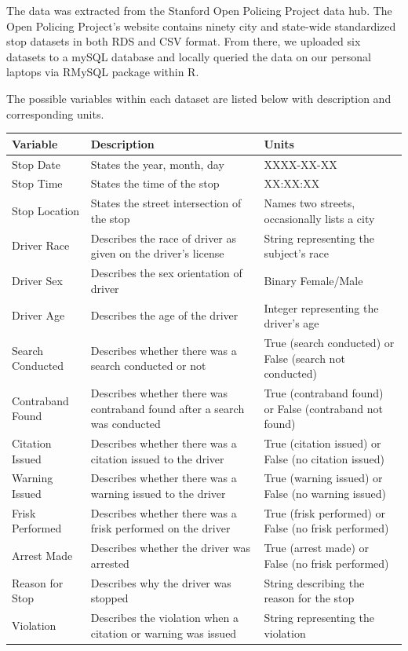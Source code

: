 \documentclass[
]{book}
\begin{document}
\quad The data was extracted from the Stanford Open Policing Project data hub. The Open Policing Project's website contains ninety city and state-wide standardized stop datasets in both RDS and CSV format. From there, we uploaded six datasets to a mySQL database and locally queried the data on our personal laptops via RMySQL package within R.

\quad The possible variables within each dataset are listed below with description and corresponding units.

\begin{tabular}{l|l|l}
\hline
Variable & Description & Units\\
\hline
Stop Date & States the year, month, day & XXXX-XX-XX\\
\hline
Stop Time & States the time of the stop & XX:XX:XX\\
\hline
Stop Location & States the street intersection of the stop & Names two streets, occasionally lists a city\\
\hline
Driver Race & Describes the race of driver as given on the driver’s license & String representing the subject’s race\\
\hline
Driver Sex & Describes the sex orientation of driver & Binary Female/Male\\
\hline
Driver Age & Describes the age of the driver & Integer representing the driver’s age\\
\hline
Search Conducted & Describes whether there was a search conducted or not & True (search conducted) or False (search not conducted)\\
\hline
Contraband Found & Describes whether there was contraband found after a search was conducted & True (contraband found) or False (contraband not found)\\
\hline
Citation Issued & Describes whether there was a citation issued to the driver & True (citation issued) or False (no citation issued)\\
\hline
Warning Issued & Describes whether there was a warning issued to the driver & True (warning issued) or False (no warning issued)\\
\hline
Frisk Performed & Describes whether there was a frisk performed on the driver & True (frisk performed) or False (no frisk performed)\\
\hline
Arrest Made & Describes whether the driver was arrested & True (arrest made) or False (no frisk performed)\\
\hline
Reason for Stop & Describes why the driver was stopped & String describing the reason for the stop\\
\hline
Violation & Describes the violation when a citation or warning was issued & String representing the violation\\
\hline
\end{tabular}
\end{document}
